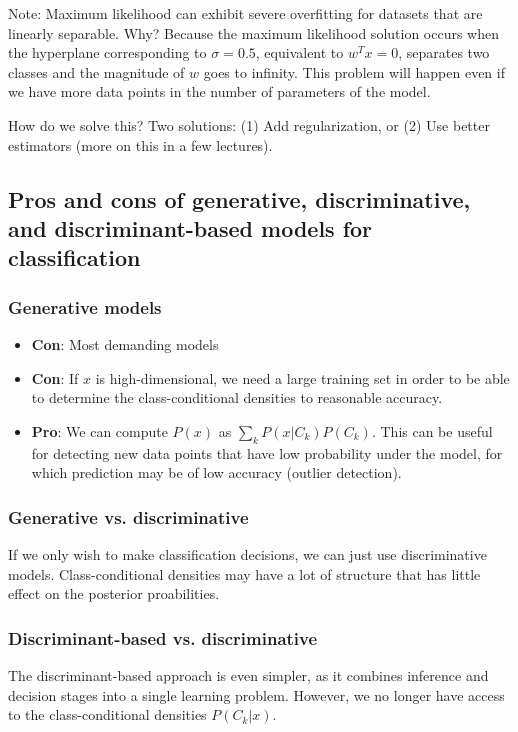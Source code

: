 \documentclass[a4paper,12pt]{article}
\begin{document}
Note: Maximum likelihood can exhibit severe overfitting for datasets that are linearly separable. Why? Because the maximum likelihood solution occurs when the hyperplane corresponding to $\sigma=0.5$, equivalent to $w^Tx = 0$, separates two classes and the magnitude of $w$ goes to infinity. This problem will happen even if we have more data points in the number of parameters of the model. 

How do we solve this? Two solutions: (1) Add regularization, or (2) Use better estimators (more on this in a few lectures). 

\subsection{Pros and cons of generative, discriminative, and discriminant-based models for classification}

\subsubsection{Generative models}

\begin{itemize}
\item
\textbf{Con}: Most demanding models
\item
\textbf{Con}: If $x$ is high-dimensional, we need a large training set in order to be able to determine the class-conditional densities to reasonable accuracy. 
\item
\textbf{Pro}: We can compute $P(x)$ as $\sum_k P(x|C_k)P(C_k)$. This can be useful for detecting new data points that have low probability under the model, for which prediction may be of low accuracy (outlier detection). 
\end{itemize}

\subsubsection{Generative vs. discriminative}

If we only wish to make classification decisions, we can just use discriminative models. Class-conditional densities may have a lot of structure that has little effect on the posterior proabilities. 

\subsubsection{Discriminant-based vs. discriminative}

The discriminant-based approach is even simpler, as it combines inference and decision stages into a single learning problem. However,  we no longer have access to the class-conditional densities $P(C_k|x)$. 
\end{document}
